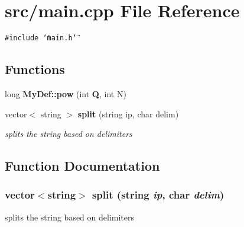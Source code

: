 \section{src/main.cpp File Reference}
\label{main_8cpp}
{\tt \#include \char`\"{}main.h\char`\"{}}\par
\subsection*{Functions}
\begin{CompactItemize}
\item 
long {\bf MyDef::pow} (int {\bf Q}, int N)
\item 
vector$<$ string $>$ {\bf split} (string ip, char delim)
\begin{CompactList}\small\item\em splits the string based on delimiters \item\end{CompactList}\end{CompactItemize}


\subsection{Function Documentation}
\subsubsection{\setlength{\rightskip}{0pt plus 5cm}vector$<$string$>$ split (string {\em ip}, char {\em delim})}\label{main_8cpp_230dd59c96e74092da88e044b72baa40}


splits the string based on delimiters 

